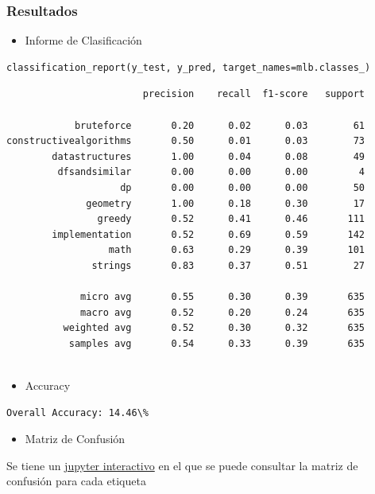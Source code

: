 \documentclass{article}
\begin{document}
		\subsubsection{Resultados}
		\begin{itemize}
    			\item Informe de Clasificación
		\end{itemize}
\begin{verbatim}
classification_report(y_test, y_pred, target_names=mlb.classes_)
\end{verbatim}

\begin{verbatim}
                        precision    recall  f1-score   support

            bruteforce       0.20      0.02      0.03        61
constructivealgorithms       0.50      0.01      0.03        73
        datastructures       1.00      0.04      0.08        49
         dfsandsimilar       0.00      0.00      0.00         4
                    dp       0.00      0.00      0.00        50
              geometry       1.00      0.18      0.30        17
                greedy       0.52      0.41      0.46       111
        implementation       0.52      0.69      0.59       142
                  math       0.63      0.29      0.39       101
               strings       0.83      0.37      0.51        27

             micro avg       0.55      0.30      0.39       635
             macro avg       0.52      0.20      0.24       635
          weighted avg       0.52      0.30      0.32       635
           samples avg       0.54      0.33      0.39       635


\end{verbatim}

\begin{itemize}
    	\item Accuracy
\end{itemize}
\begin{verbatim}
Overall Accuracy: 14.46\%
\end{verbatim}
		
\begin{itemize}
    	\item Matriz de Confusión
\end{itemize}		
Se tiene un {\href{https://github.com/ARJ-Code/codeforce-tag-predictor/blob/main/src/naive\%20bayes\%20model/naive-bayes-model.ipynb}{jupyter interactivo}} en el que se puede consultar la matriz de confusión para cada etiqueta 
\end{document}
